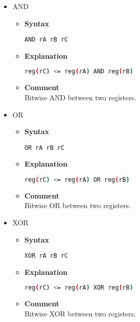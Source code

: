 \begin{itemize}
\begin{itemize}
    \end{itemize}

    \item AND
    \begin{itemize}
        \item \textbf{Syntax}
        \begin{lstlisting}[language={[x86masm]Assembler}, frame=single]
    AND rA rB rC
        \end{lstlisting}
        \item \textbf{Explanation}
        \begin{lstlisting}[language=bash, frame=single]
    reg(rC) <= reg(rA) AND reg(rB)
        \end{lstlisting}
        \item \textbf{Comment} \\
    Bitwise AND between two registers.
    \end{itemize}

    \item OR
    \begin{itemize}
        \item \textbf{Syntax}
        \begin{lstlisting}[language={[x86masm]Assembler}, frame=single]
    OR rA rB rC
        \end{lstlisting}
        \item \textbf{Explanation}
        \begin{lstlisting}[language=bash, frame=single]
    reg(rC) <= reg(rA) OR reg(rB)
        \end{lstlisting}
        \item \textbf{Comment} \\
    Bitwise OR between two registers.
    \end{itemize}

    \item XOR
    \begin{itemize}
        \item \textbf{Syntax}
        \begin{lstlisting}[language={[x86masm]Assembler}, frame=single]
    XOR rA rB rC
        \end{lstlisting}
        \item \textbf{Explanation}
        \begin{lstlisting}[language=bash, frame=single]
    reg(rC) <= reg(rA) XOR reg(rB)
        \end{lstlisting}
        \item \textbf{Comment} \\
    Bitwise XOR between two registers.
    \end{itemize}


\end{itemize}
